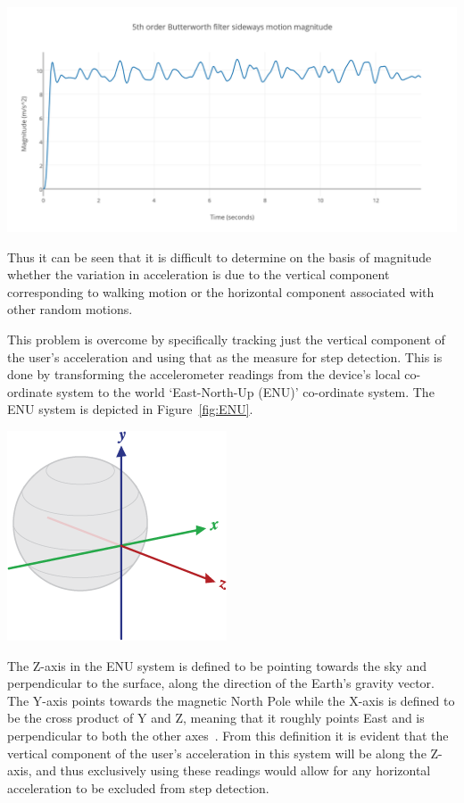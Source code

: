 \documentclass[12pt,a4paper,notitlepage]{report}
\begin{document}
\begin{center}
\includegraphics[scale=0.9]{images/butterworth5thOrderFilterSidewaysMotionMagnitude.png}
\label{fig:butterworth5thOrderFilterSidewaysMotionMagnitude}
\end{center}
Thus it can be seen that it is difficult to determine on the basis of magnitude whether the variation in acceleration is due to the vertical component corresponding to walking motion or the horizontal component associated with other random motions. 

This problem is overcome by specifically tracking just the vertical component of the user's acceleration and using that as the measure for step detection. This is done by transforming the accelerometer readings from the device's local co-ordinate system to the world `East-North-Up (ENU)' co-ordinate system. The ENU system is depicted in Figure~\ref{fig:ENU}. 

\begin{center}
\includegraphics[scale=0.5]{images/ENU.png}
\label{fig:ENU}
\end{center}
The Z-axis in the ENU system is defined to be pointing towards the sky and perpendicular to the surface, along the direction of the Earth's gravity vector. The Y-axis points towards the magnetic North Pole while the X-axis is defined to be the cross product of Y and Z, meaning that it roughly points East and is perpendicular to both the other axes~\cite{ENU}. From this definition it is evident that the vertical component of the user's acceleration in this system will be along the Z-axis, and thus exclusively using these readings would allow for any horizontal acceleration to be excluded from step detection. 
\end{document}
